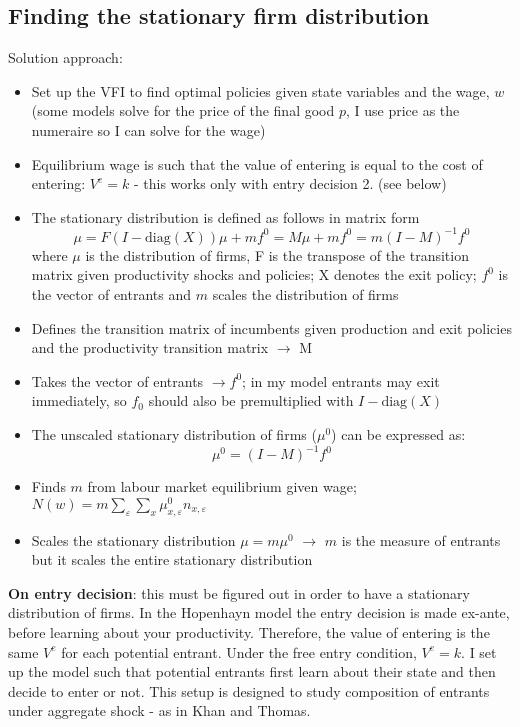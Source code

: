 \documentclass[12pt]{article}
\begin{document}
\subsection*{Finding the stationary firm distribution}
Solution approach:
\begin{itemize} \setlength\itemsep{0em}
    \item Set up the VFI to find optimal policies given state variables and the wage, $w$ (some models solve for the price of the final good $p$, I use price as the numeraire so I can solve for the wage)
    \item Equilibrium wage is such that the value of entering is equal to the cost of entering: $V^e = k$ - this works only with entry decision 2. (see below)
    \item The stationary distribution is defined as follows in matrix form 
       $$ \mu = F(I-\text{diag}(X)) \mu + mf^0 = M\mu + mf^0 = m(I-M)^{-1}f^0 $$
       where $\mu$ is the distribution of firms, F is the transpose of the transition matrix given productivity shocks and policies; X denotes the exit policy; $f^0$ is the vector of entrants and $m$ scales the distribution of firms
    \item Defines the transition matrix of incumbents given production and exit policies and the productivity transition matrix $\rightarrow$ M
    \item Takes the vector of entrants $\rightarrow f^0$; in my model entrants may exit immediately, so $f_0$ should also be premultiplied with $I-\text{diag}(X)$
    \item The unscaled stationary distribution of firms ($\mu^{0}$) can be expressed as: 
        $$\mu^{0}= (I-M)^{-1}f^0$$
    \item Finds $m$ from labour market equilibrium given wage; 
        $N(w) = m \sum_\varepsilon \sum_x \mu^{0}_{x, \varepsilon} n_{x, \varepsilon} $
    \item Scales the stationary distribution $\mu = m\mu^0$ $\rightarrow$ $m$ is the measure of entrants but it scales the entire stationary distribution
\end{itemize}
 \textbf{On entry decision}: this must be figured out in order to have a stationary distribution of firms. In the Hopenhayn model the entry decision is made ex-ante, before learning about your productivity. Therefore, the value of entering is the same $V^e$ for each potential entrant. Under the free entry condition, $V^e = k$. I set up the model such that potential entrants first learn about their state and then decide to enter or not. This setup is designed to study composition of entrants under aggregate shock - as in Khan and Thomas. \vspace{3mm} \\
\end{document}
